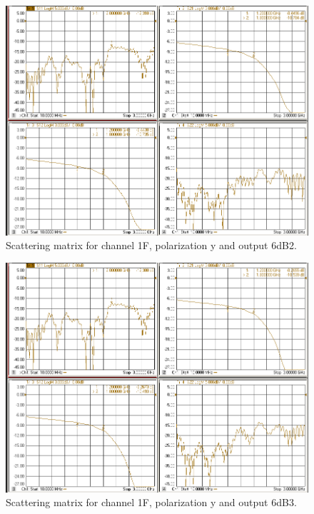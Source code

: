 \documentclass[12pt,a4paper,oneside]{article}
\begin{document}
\begin{figure}[H]
\centering
\includegraphics[width=0.9\linewidth]{VNA_results/1Fy_6dB2.png}
\caption{Scattering matrix for channel 1F, polarization y and output 6dB2.}
\label{fig:1Fy_6dB2}
\end{figure}


\begin{figure}[H]
\centering
\includegraphics[width=0.9\linewidth]{VNA_results/1Fy_6dB3.png}
\caption{Scattering matrix for channel 1F, polarization y and output 6dB3.}
\label{fig:1Fy_6dB3}
\end{figure}
\end{document}
